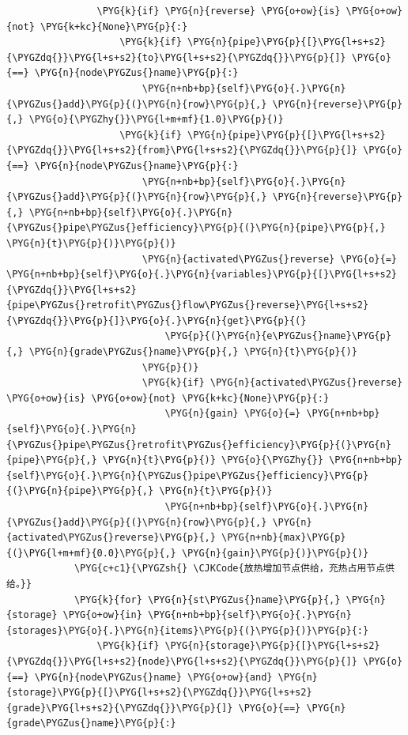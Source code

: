 \begin{Verbatim}
                \PYG{k}{if} \PYG{n}{reverse} \PYG{o+ow}{is} \PYG{o+ow}{not} \PYG{k+kc}{None}\PYG{p}{:}
                    \PYG{k}{if} \PYG{n}{pipe}\PYG{p}{[}\PYG{l+s+s2}{\PYGZdq{}}\PYG{l+s+s2}{to}\PYG{l+s+s2}{\PYGZdq{}}\PYG{p}{]} \PYG{o}{==} \PYG{n}{node\PYGZus{}name}\PYG{p}{:}
                        \PYG{n+nb+bp}{self}\PYG{o}{.}\PYG{n}{\PYGZus{}add}\PYG{p}{(}\PYG{n}{row}\PYG{p}{,} \PYG{n}{reverse}\PYG{p}{,} \PYG{o}{\PYGZhy{}}\PYG{l+m+mf}{1.0}\PYG{p}{)}
                    \PYG{k}{if} \PYG{n}{pipe}\PYG{p}{[}\PYG{l+s+s2}{\PYGZdq{}}\PYG{l+s+s2}{from}\PYG{l+s+s2}{\PYGZdq{}}\PYG{p}{]} \PYG{o}{==} \PYG{n}{node\PYGZus{}name}\PYG{p}{:}
                        \PYG{n+nb+bp}{self}\PYG{o}{.}\PYG{n}{\PYGZus{}add}\PYG{p}{(}\PYG{n}{row}\PYG{p}{,} \PYG{n}{reverse}\PYG{p}{,} \PYG{n+nb+bp}{self}\PYG{o}{.}\PYG{n}{\PYGZus{}pipe\PYGZus{}efficiency}\PYG{p}{(}\PYG{n}{pipe}\PYG{p}{,} \PYG{n}{t}\PYG{p}{)}\PYG{p}{)}
                        \PYG{n}{activated\PYGZus{}reverse} \PYG{o}{=} \PYG{n+nb+bp}{self}\PYG{o}{.}\PYG{n}{variables}\PYG{p}{[}\PYG{l+s+s2}{\PYGZdq{}}\PYG{l+s+s2}{pipe\PYGZus{}retrofit\PYGZus{}flow\PYGZus{}reverse}\PYG{l+s+s2}{\PYGZdq{}}\PYG{p}{]}\PYG{o}{.}\PYG{n}{get}\PYG{p}{(}
                            \PYG{p}{(}\PYG{n}{e\PYGZus{}name}\PYG{p}{,} \PYG{n}{grade\PYGZus{}name}\PYG{p}{,} \PYG{n}{t}\PYG{p}{)}
                        \PYG{p}{)}
                        \PYG{k}{if} \PYG{n}{activated\PYGZus{}reverse} \PYG{o+ow}{is} \PYG{o+ow}{not} \PYG{k+kc}{None}\PYG{p}{:}
                            \PYG{n}{gain} \PYG{o}{=} \PYG{n+nb+bp}{self}\PYG{o}{.}\PYG{n}{\PYGZus{}pipe\PYGZus{}retrofit\PYGZus{}efficiency}\PYG{p}{(}\PYG{n}{pipe}\PYG{p}{,} \PYG{n}{t}\PYG{p}{)} \PYG{o}{\PYGZhy{}} \PYG{n+nb+bp}{self}\PYG{o}{.}\PYG{n}{\PYGZus{}pipe\PYGZus{}efficiency}\PYG{p}{(}\PYG{n}{pipe}\PYG{p}{,} \PYG{n}{t}\PYG{p}{)}
                            \PYG{n+nb+bp}{self}\PYG{o}{.}\PYG{n}{\PYGZus{}add}\PYG{p}{(}\PYG{n}{row}\PYG{p}{,} \PYG{n}{activated\PYGZus{}reverse}\PYG{p}{,} \PYG{n+nb}{max}\PYG{p}{(}\PYG{l+m+mf}{0.0}\PYG{p}{,} \PYG{n}{gain}\PYG{p}{)}\PYG{p}{)}
            \PYG{c+c1}{\PYGZsh{} \CJKCode{放热增加节点供给，充热占用节点供给。}}
            \PYG{k}{for} \PYG{n}{st\PYGZus{}name}\PYG{p}{,} \PYG{n}{storage} \PYG{o+ow}{in} \PYG{n+nb+bp}{self}\PYG{o}{.}\PYG{n}{storages}\PYG{o}{.}\PYG{n}{items}\PYG{p}{(}\PYG{p}{)}\PYG{p}{:}
                \PYG{k}{if} \PYG{n}{storage}\PYG{p}{[}\PYG{l+s+s2}{\PYGZdq{}}\PYG{l+s+s2}{node}\PYG{l+s+s2}{\PYGZdq{}}\PYG{p}{]} \PYG{o}{==} \PYG{n}{node\PYGZus{}name} \PYG{o+ow}{and} \PYG{n}{storage}\PYG{p}{[}\PYG{l+s+s2}{\PYGZdq{}}\PYG{l+s+s2}{grade}\PYG{l+s+s2}{\PYGZdq{}}\PYG{p}{]} \PYG{o}{==} \PYG{n}{grade\PYGZus{}name}\PYG{p}{:}

\end{Verbatim}

